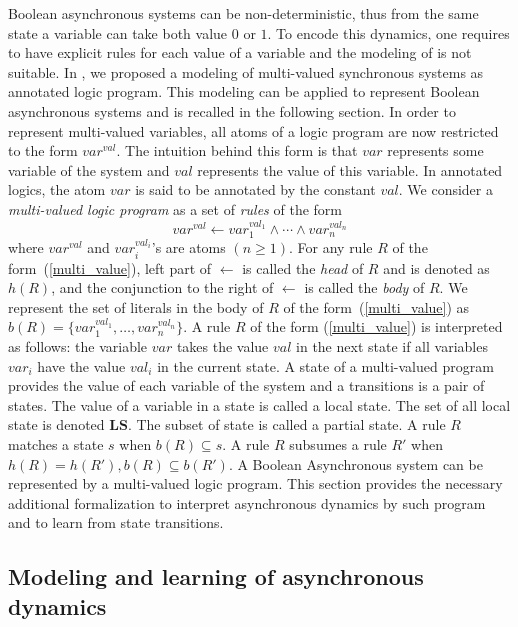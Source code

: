 	Boolean asynchronous systems can be non-deterministic, thus from the same state a variable can take both value $0$ or $1$.
	To encode this dynamics, one requires to have explicit rules for each value of a variable and the modeling of \cite{ribeiro2015learning} is not suitable.
	In \cite{DMTRICLP15}, we proposed a modeling of multi-valued synchronous systems as annotated logic program.
    This modeling can be applied to represent Boolean asynchronous systems and is recalled in the following section.
	In order to represent multi-valued variables, all atoms of a logic program are now restricted to the form $var^{val}$.
	The intuition behind this form is that $var$ represents some variable of the system and $val$ represents the value of this variable.
	In annotated logics, the atom $var$ is said to be annotated by the constant $val$.
	We consider a {\it multi-valued logic program\/} as a set of {\it rules\/} of the form  
	\begin{equation}\label{multi_value}
		var^{val} \leftarrow var_1^{val_1} \wedge \cdots \wedge var_n^{val_n}
	\end{equation}
	where $var^{val}$ and $var_i^{val_i}$'s are atoms $(n \geq 1)$.
	For any rule $R$ of the form~(\ref{multi_value}), left part of $\leftarrow$ is called the {\it head\/} of $R$ and is denoted as $h(R)$,
	and the conjunction to the right of $\leftarrow$ is called the {\it body\/} of $R$.  
	We represent the set of literals in the body of $R$ of the form~(\ref{multi_value}) as $b(R)=\{var_1^{val_1},\ldots,var_n^{val_n}\}$. 
	A rule $R$ of the form (\ref{multi_value}) is interpreted as follows:
	the variable $var$ takes the value $val$ in the next state if all variables $var_i$ have the value $val_i$ in the current state.
	A state of a multi-valued program provides the value of each variable of the system and a transitions is a pair of states.
	The value of a variable in a state is called a local state.
	The set of all local state is denoted $\mathbf{LS}$.
	The subset of state is called a partial state.
	A rule $R$ matches a state $s$ when $b(R) \subseteq s$.
	A rule $R$ subsumes a rule $R'$ when $h(R)=h(R'), b(R) \subseteq b(R')$.
%
A Boolean Asynchronous system can be represented by a multi-valued logic program.
This section provides the necessary additional formalization to interpret asynchronous dynamics by such program and to learn from state transitions.

\subsection{Modeling and learning of asynchronous dynamics}\label{sec:alfit}

